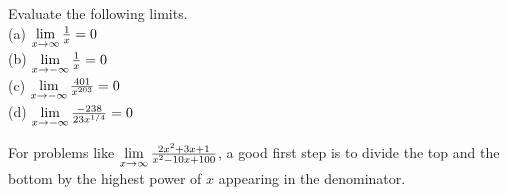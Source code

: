 \begin{exercise}\nonumber
	Evaluate the following limits. \\

	(a) $ \lim\limits_{x \rightarrow \infty}{1 \over x} = 0 $ \\

	(b) $ \lim\limits_{x \rightarrow -\infty}{1 \over x} = 0 $ \\

	(c) $ \lim\limits_{x \rightarrow -\infty}{401 \over x^{203}} = 0 $ \\

	(d) $ \lim\limits_{x \rightarrow -\infty}{-238 \over 23x^{1/4}} = 0 $
\end{exercise}

For problems like $ \lim\limits_{x \rightarrow \infty}{2x^2 + 3x + 1 \over x^2 - 10x + 100} $, a good first step is to divide the top and the bottom by the highest power of $ x $ appearing in the denominator. \\

